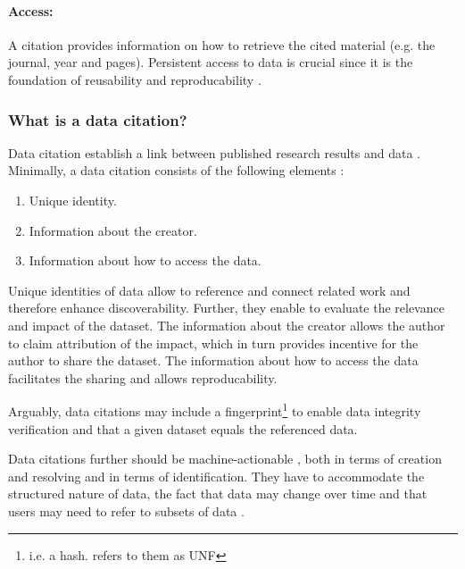 \documentclass[a4paper,10pt]{article}
\begin{document}
\paragraph{Access:} 
A citation provides information on how to retrieve the cited material (e.g. the journal, year and pages). Persistent access to data is crucial since it is the foundation of reusability and reproducability \citep{Starr2015}.


\subsubsection{What is a data citation?}
Data citation establish a link between published research results and data \citep{CODATA2013}. Minimally, a data citation consists of the following elements \citep{Cook2016}:

\begin{enumerate}
 \item Unique identity.
 \item Information about the creator.
 \item Information about how to access the data.
\end{enumerate}

Unique identities of data allow to reference and connect related work and therefore enhance discoverability. Further, they enable to evaluate the relevance and impact of the dataset. The information about the creator allows the author to claim attribution of the impact, which in turn provides incentive for the author to share the dataset. The information about how to access the data facilitates the sharing and allows reproducability.

Arguably, data citations may include a fingerprint\footnote{i.e. a hash. \citep{Crosas2011} refers to them as \gls{UNF}} to enable data integrity verification \citep{Crosas2011} and that a given dataset equals the referenced data.

Data citations further should be machine-actionable \citep{Assante2016, Altman2015, Buneman2016}, both in terms of creation and resolving and in terms of identification.
They have to accommodate the structured nature of data, the fact that data may change over time and that users may need to refer to subsets of data \citep{Buneman2010}.
\end{document}
